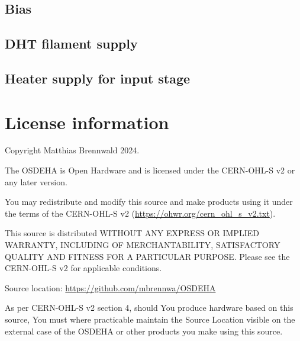 \subsection{Bias}

\subsection{DHT filament supply}

\subsection{Heater supply for input stage}


\section{License information} 
Copyright Matthias Brennwald 2024.                                                    

The OSDEHA is Open Hardware and is licensed under the CERN-OHL-S v2 or any later version.

You may redistribute and modify this source and make products using it under the terms of the CERN-OHL-S v2 (\url{https://ohwr.org/cern_ohl_s_v2.txt}).

This source is distributed WITHOUT ANY EXPRESS OR IMPLIED WARRANTY, INCLUDING OF MERCHANTABILITY, SATISFACTORY QUALITY AND FITNESS FOR A PARTICULAR PURPOSE. Please see the CERN-OHL-S v2 for applicable conditions.

Source location: \url{https://github.com/mbrennwa/OSDEHA}

As per CERN-OHL-S v2 section 4, should You produce hardware based on this source, You must where practicable maintain the Source Location visible on the external case of the OSDEHA or other products you make using this source.            






